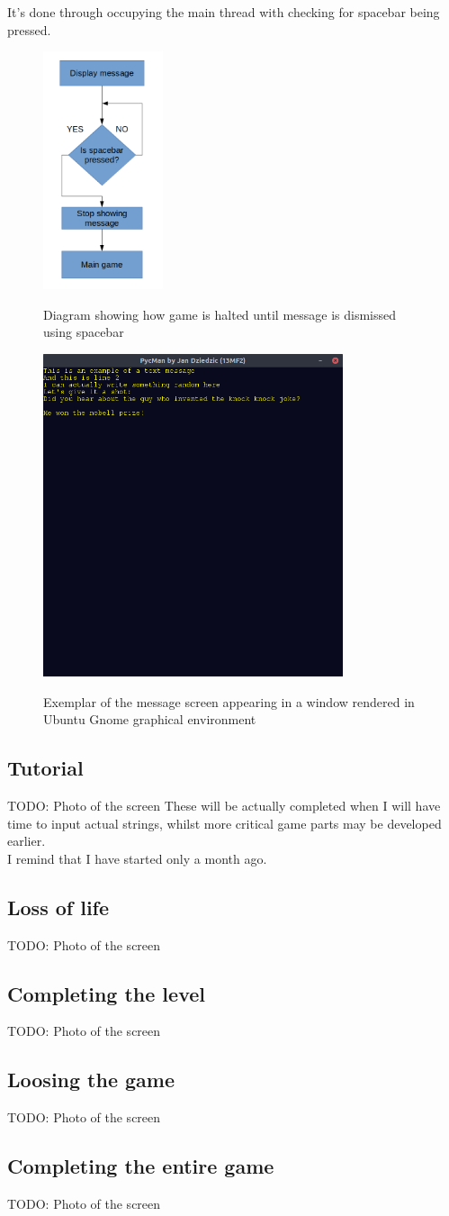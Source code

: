 \documentclass[11pt,a4paper]{report}
\newcommand{\dsubsection}[1]{\FloatBarrier \subsection{#1}}
\newenvironment{img}{
	\begin{center}
		\begin{figure}[H]
			\begin{center}
			
}{
	\end{center}
		\end{figure}
			\end{center}
}
\begin{document}
			It's done through occupying the main thread with checking for spacebar being pressed.
			\begin{img}
				\includegraphics[width=100pt]{images/message-dismiss}\\
				\caption{Diagram showing how game is halted until message is dismissed using spacebar}
			\end{img}
			\begin{img}
				\includegraphics[width=250pt]{images/message-example-joke}\\
				\caption{Exemplar of the message screen appearing in a window rendered in Ubuntu Gnome graphical environment}
			\end{img}
			\dsubsection{Tutorial}
				TODO: Photo of the screen These will be actually completed when I will have time to input actual strings, whilst more critical game parts may be developed earlier.\\
				I remind that I have started only a month ago.
			\dsubsection{Loss of life}
				TODO: Photo of the screen
			\dsubsection{Completing the level}
				TODO: Photo of the screen
			\dsubsection{Loosing the game}
				TODO: Photo of the screen
			\dsubsection{Completing the entire game}
				TODO: Photo of the screen
\end{document}

